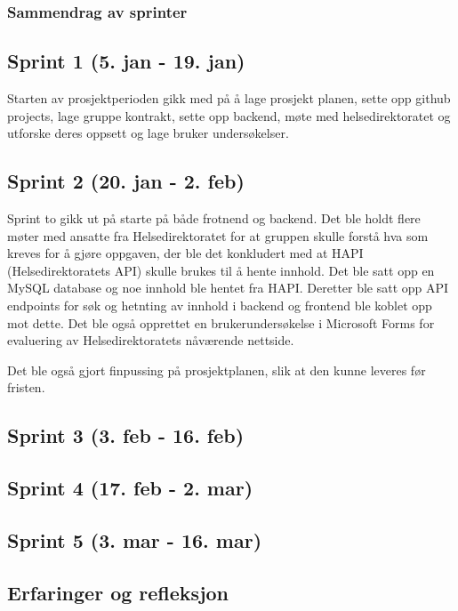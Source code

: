 \subsubsection{Sammendrag av sprinter}

\subsection*{Sprint 1 (5. jan - 19. jan)}
Starten av prosjektperioden gikk med på å lage prosjekt planen, sette opp github projects, lage gruppe kontrakt, sette opp backend, møte med helsedirektoratet og utforske deres oppsett og lage bruker undersøkelser. 

\subsection*{Sprint 2 (20. jan - 2. feb)}
Sprint to gikk ut på starte på både frotnend og backend. Det ble holdt flere møter med ansatte fra Helsedirektoratet for at gruppen skulle forstå hva som kreves for å gjøre oppgaven, der ble det konkludert med at HAPI (Helsedirektoratets API) skulle brukes til å hente innhold. Det ble satt opp en MySQL database og noe innhold ble hentet fra HAPI. Deretter ble satt opp API endpoints for søk og hetnting av innhold i backend og frontend ble koblet opp mot dette. Det ble også opprettet en brukerundersøkelse i Microsoft Forms for evaluering av Helsedirektoratets nåværende nettside. 

Det ble også gjort finpussing på prosjektplanen, slik at den kunne leveres før fristen.

\subsection*{Sprint 3 (3. feb - 16. feb)}

\subsection*{Sprint 4 (17. feb - 2. mar)}

\subsection*{Sprint 5 (3. mar - 16. mar)}

\subsection{Erfaringer og refleksjon}